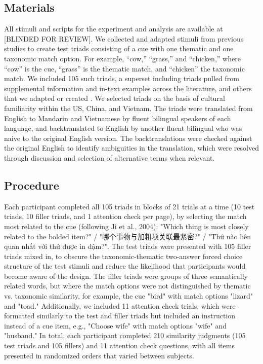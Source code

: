 \documentclass[10pt, letterpaper]{article}
\begin{document}
\hypertarget{materials}{%
\subsection{Materials}\label{materials}}

All stimuli and scripts for the experiment and analysis are available at
{[}BLINDED FOR REVIEW{]}. We collected and adapted stimuli from previous
studies to create test triads consisting of a cue with one thematic and
one taxonomic match option. For example, ``cow,'' ``grass,'' and
``chicken,'' where ``cow'' is the cue, ``grass'' is the thematic match,
and ``chicken'' the taxonomic match. We included 105 such triads, a
superset including triads pulled from supplemental information and
in-text examples across the literature, and others that we adapted or
created . We selected triads on the basis of cultural familiarity within
the US, China, and Vietnam. The triads were translated from English to
Mandarin and Vietnamese by fluent bilingual speakers of each language,
and backtranslated to English by another fluent bilingual who was naive
to the original English version. The backtranslations were checked
against the original English to identify ambiguities in the translation,
which were resolved through discussion and selection of alternative
terms when relevant.

\hypertarget{procedure}{%
\subsection{Procedure}\label{procedure}}

\begin{CJK*}{UTF8}{gbsn}
Each participant completed all 105 triads in blocks of 21 trials at a time (10 test triads, 10 filler triads, and 1 attention check per page), by selecting the match most related to the cue (following Ji et al., 2004): "Which thing is most closely related to the bolded item?" / "哪个事物与加粗项关联最紧密?" / "Thứ nào liên quan nhất với thứ được in đậm?".
The test triads were presented with 105 filler triads mixed in, to obscure the taxonomic-thematic two-answer forced choice structure of the test stimuli and reduce the likelihood that participants would become aware of the design.
The filler triads were groups of three semantically related words, but where the match options were not distinguished by thematic vs. taxonomic similarity, for example, the cue "bird" with match options "lizard" and "toad." Additionally, we included 11 attention check trials, which were formatted similarly to the test and filler triads but included an instruction instead of a cue item, e.g., "Choose wife" with match options "wife" and "husband." In total, each participant completed 210 similarity judgments (105 test triads and 105 fillers) and 11 attention check questions, with all items presented in randomized orders that varied between subjects.
\end{CJK*}
\end{document}

